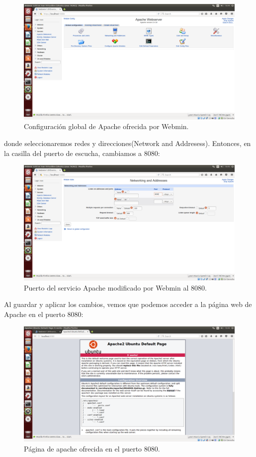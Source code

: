 \begin{itemize}
	\begin{figure}[H]
		\centering
		\includegraphics[width=0.7\linewidth]{WebminApacheGlobalConf}
		\caption[Configuracion global apache]{Configuración global de Apache ofrecida por Webmin.}
		\label{fig:WebminApacheGlobalConf}
	\end{figure}
	
	donde seleccionaremos redes y direcciones(Network and Addresess). Entonces, en la casilla del puerto de escucha, cambiamos a 8080:\\
	
	\begin{figure}[H]
	\centering
	\includegraphics[width=0.7\linewidth]{WebminPuertoCambiado}
	\caption[Modificacion Puerto]{Puerto del servicio Apache modificado por Webmin al 8080.}
	\label{fig:WebminPuerto8080}
	\end{figure}
	
	Al guardar y aplicar los cambios, vemos que podemos acceder a la página web de Apache en el puerto 8080:\\
	
	\begin{figure}[H]
		\centering
		\includegraphics[width=0.7\linewidth]{WebminPuerto8080}
		\caption[Puerto cambiado 2]{Página de apache ofrecida en el puerto 8080.}
		\label{fig:WebminPuertoCambiado}
	\end{figure}


\end{itemize}
